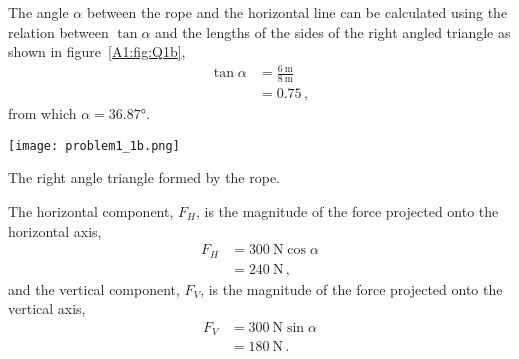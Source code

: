 The angle $\alpha$ between the rope and the horizontal line can be calculated using the relation between $\tan\alpha$ and the lengths of the sides of the right angled triangle as shown in figure~\ref{A1:fig:Q1b},
\begin{align*}
	\tan\alpha	&=\frac{\SI{6}{\m}}{\SI{8}{\m}}\\
				&=0.75 \, ,	
\end{align*}
from which $\alpha=\ang{36.87}$.
\begin{marginfigure}
\centering
\texttt{[image: problem1\_1b.png]}
\caption{The right angle triangle formed by the rope.}
\label{A1:fig:Q1b}
\end{marginfigure}

The horizontal component, $F_H$, is the magnitude of the force projected onto the horizontal axis,
\begin{align*}
	F_H	&=\SI{300}{\N} \cos\alpha \\
		&= \SI{240}{\N} \,,
\end{align*} and the vertical component, $F_V$, is the magnitude of the force projected onto the vertical axis, 
\begin{align*}
	F_V	&=\SI{300}{\N} \sin\alpha \\
		&= \SI{180}{\N}\, .
\end{align*}
\clearpage
